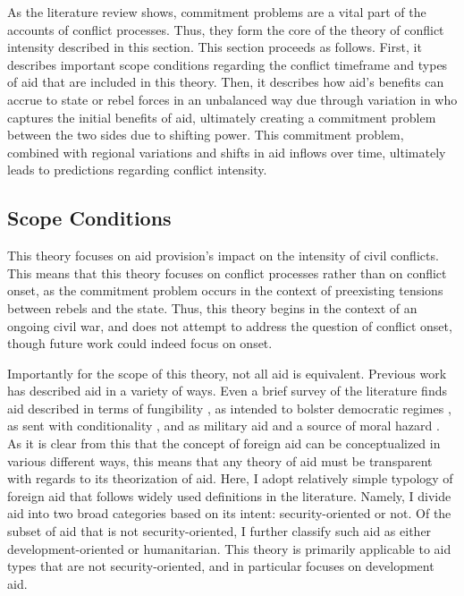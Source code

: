 \documentclass[12pt, letterpaper]{article}
\renewcommand{\cite}{\citep}
\begin{document}
As the literature review shows, commitment problems are a vital part of the accounts of conflict processes. Thus, they form the core of the theory of conflict intensity described in this section. This section proceeds as follows. First, it describes important scope conditions regarding the conflict timeframe and types of aid that are included in this theory. Then, it describes how aid’s benefits can accrue to state or rebel forces in an unbalanced way due through variation in who captures the initial benefits of aid, ultimately creating a commitment problem between the two sides due to shifting power. This commitment problem, combined with regional variations and shifts in aid inflows over time, ultimately leads to predictions regarding conflict intensity.

\subsection{Scope Conditions}

This theory focuses on aid provision’s impact on the intensity of civil conflicts. This means that this theory focuses on conflict processes rather than on conflict onset, as the commitment problem occurs in the context of preexisting tensions between rebels and the state. Thus, this theory begins in the context of an ongoing civil war, and does not attempt to address the question of conflict onset, though future work could indeed focus on onset. 

Importantly for the scope of this theory, not all aid is equivalent. Previous work has described aid in a variety of ways. Even a brief survey of the literature finds aid described in terms of fungibility \cite{bermeo2016}, as intended to bolster democratic regimes \cite{savuntirone2011}, as sent with conditionality \cite{carnegiemarinov2017}, and as military aid and a source of moral hazard \cite{bapat2011}. As it is clear from this that the concept of foreign aid can be conceptualized in various different ways, this means that any theory of aid must be transparent with regards to its theorization of aid. Here, I adopt relatively simple typology of foreign aid that follows widely used definitions in the literature. Namely, I divide aid into two broad categories based on its intent: security-oriented or not. Of the subset of aid that is not security-oriented, I further classify such aid as either development-oriented or humanitarian. This theory is primarily applicable to aid types that are not security-oriented, and in particular focuses on development aid.
\end{document}
